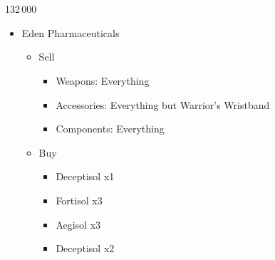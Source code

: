 \chapter{}
\begin{shop}{132\,000}
\begin{itemize}
    \item Eden Pharmaceuticals
    \begin{itemize}
        \item Sell
        \begin{itemize}
            \item Weapons: Everything
            \item Accessories: Everything but Warrior's Wristband
            \item Components: Everything
        \end{itemize}
        \item Buy
        \begin{itemize}
            \item Deceptisol x1
            \item Fortisol x3
            \item Aegisol x3
            \item Deceptisol x2
        \end{itemize}
    \end{itemize}
\end{itemize}
\end{shop}

